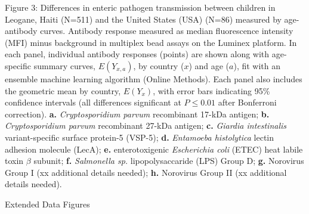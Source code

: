 \documentclass[11pt]{article}
\begin{document}
\clearpage
Figure 3: Differences in enteric pathogen transmission between children in Leogane, Haiti (N=511) and the United States (USA) (N=86) measured by age-antibody curves. Antibody response measured as median fluorescence intensity (MFI) minus background in multiplex bead assays on the Luminex platform. In each panel, individual antibody responses (points) are shown along with age-specific summary curves, $E(Y_{x,a})$, by country ($x$) and age ($a$), fit with an ensemble machine learning algorithm (Online Methods). Each panel also includes the geometric mean by country, $E(Y_{x})$, with error bars indicating 95\% confidence intervals (all differences significant at $P\leq0.01$ after Bonferroni correction).
\textbf{a.} \textit{Cryptosporidium parvum} recombinant 17-kDa antigen;
\textbf{b.} \textit{Cryptosporidium parvum} recombinant 27-kDa antigen;
\textbf{c.} \textit{Giardia intestinalis} variant-specific surface protein-5 (VSP-5);
\textbf{d.} \textit{Entamoeba histolytica} lectin adhesion molecule (LecA);
\textbf{e.} enterotoxigenic \textit{Escherichia coli} (ETEC) heat labile toxin $\beta$ subunit;
\textbf{f.} \textit{Salmonella sp.} lipopolysaccaride (LPS) Group D;
\textbf{g.} Norovirus Group I (xx additional details needed);
\textbf{h.} Norovirus Group II (xx additional details needed).

\clearpage
\begin{center}
{\Large Extended Data Figures}
\end{center}
\vspace{50pt}

\renewcommand{\figurename}{Extended Data Fig.}
\setcounter{figure}{0} 
\end{document}
